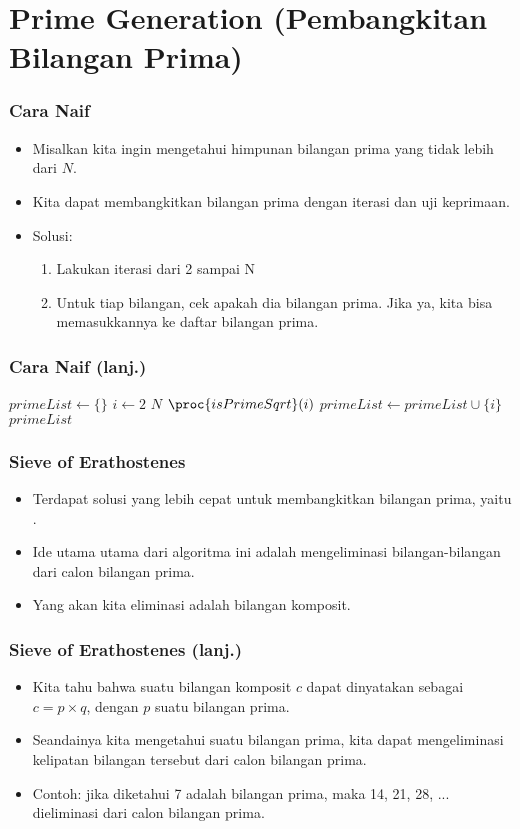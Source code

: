 \section{Prime Generation \newline (Pembangkitan Bilangan Prima)}
\frame{\sectionpage}

\begin{frame}
\frametitle{Cara Naif}
\begin{itemize}
  \item Misalkan kita ingin mengetahui himpunan bilangan prima yang tidak lebih dari $N$.
  \item Kita dapat membangkitkan bilangan prima dengan iterasi dan uji keprimaan.
  \item Solusi: 
  \begin{enumerate}
    \item Lakukan iterasi dari 2 sampai N
    \item Untuk tiap bilangan, cek apakah dia bilangan prima. Jika ya, kita bisa memasukkannya ke daftar bilangan prima.
  \end{enumerate}
\end{itemize}
\end{frame}

\begin{frame}
\frametitle{Cara Naif (lanj.)}
\begin{codebox}
\li $primeList \gets \{\}$
\li \For $i \gets 2$ \To $N$
    \Do
\li   \If $\proc{isPrimeSqrt}(i)$
      \Then
\li     $primeList \gets primeList \cup \{i\}$
      \End    
    \End
\li \Return $primeList$
\end{codebox}
\end{frame}

\begin{frame}
\frametitle{Sieve of Erathostenes}
\begin{itemize}
  \item Terdapat solusi yang lebih cepat untuk membangkitkan bilangan prima, yaitu .
  \item Ide utama utama dari algoritma ini adalah mengeliminasi bilangan-bilangan dari calon bilangan prima.
  \item Yang akan kita eliminasi adalah bilangan komposit.
\end{itemize}
\end{frame}

\begin{frame}
\frametitle{Sieve of Erathostenes (lanj.)}
\begin{itemize}
  \item Kita tahu bahwa suatu bilangan komposit $c$ dapat dinyatakan sebagai $c = p \times q$, dengan $p$ suatu bilangan prima.
  \item Seandainya kita mengetahui suatu bilangan prima, kita dapat mengeliminasi kelipatan bilangan tersebut dari calon bilangan prima.
  \item Contoh: jika diketahui 7 adalah bilangan prima, maka 14, 21, 28, ... dieliminasi dari calon bilangan prima.
\end{itemize}
\end{frame}

